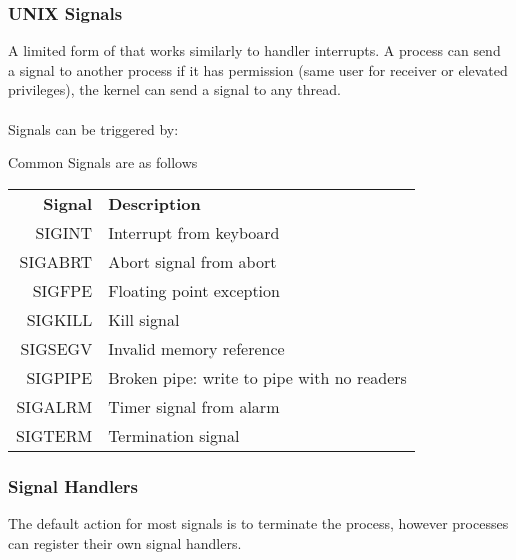\documentclass{report}
\begin{document}
\subsubsection*{UNIX Signals}
A limited form of  that works similarly to handler interrupts. A process can send a signal to another process if it has permission (same user for receiver or elevated privileges), the kernel can send a signal to any thread.
\\
\\ Signals can be triggered by:
\begin{itemize}
\end{itemize}
Common Signals are as follows
\begin{center}
	\begin{tabular}{r l}
		\textbf{Signal} & \textbf{Description}                       \\
		SIGINT          & Interrupt from keyboard                    \\
		SIGABRT         & Abort signal from abort                    \\
		SIGFPE          & Floating point exception                   \\
		SIGKILL         & Kill signal                                \\
		SIGSEGV         & Invalid memory reference                   \\
		SIGPIPE         & Broken pipe: write to pipe with no readers \\
		SIGALRM         & Timer signal from alarm                    \\
		SIGTERM         & Termination signal                         \\
	\end{tabular}
\end{center}
\subsubsection*{Signal Handlers}
The default action for most signals is to terminate the process, however processes can register their own signal handlers.

\end{document}
